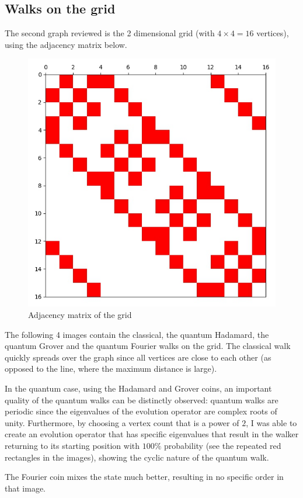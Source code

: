 \subsection{Walks on the grid}

The second graph reviewed is the 2 dimensional grid (with $4\times{}4=16$ vertices), using the adjacency matrix below.

\begin{figure}[H]
\centering
\includegraphics[width=0.5\linewidth]{./figures/results/grid/graph.jpg}
\caption{Adjacency matrix of the grid}
\end{figure}

The following 4 images contain the classical, the quantum Hadamard, the quantum Grover and the quantum Fourier walks on the grid. The classical walk quickly spreads over the graph since all vertices are close to each other (as opposed to the line, where the maximum distance is large).

In the quantum case, using the Hadamard and Grover coins, an important quality of the quantum walks can be distinctly observed: quantum walks are periodic since the eigenvalues of the evolution operator are complex roots of unity. Furthermore, by choosing a vertex count that is a power of $2$, I was able to create an evolution operator that has specific eigenvalues that result in the walker returning to its starting position
with $100\%$ probability (see the repeated red rectangles in the images), showing the cyclic nature of the quantum walk.

The Fourier coin mixes the state much better, resulting in no specific order in that image.

